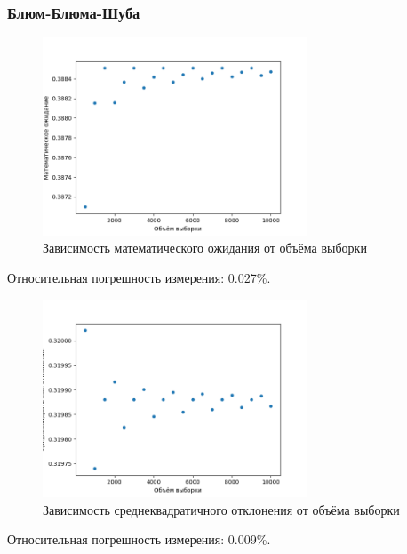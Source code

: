 \documentclass[bachelor, och, labwork]{SCWorks}
\begin{document}
\subsubsection{Блюм-Блюма-Шуба}
\begin{figure}[H]
  \centering
  \includegraphics[width=0.7\textwidth]{bbs_me.png}
  \caption{Зависимость математического ожидания от объёма выборки}
\end{figure}
Относительная погрешность измерения: 0.027\%.

\begin{figure}[H]
  \centering
  \includegraphics[width=0.7\textwidth]{bbs_st.png}
  \caption{Зависимость среднеквадратичного отклонения от объёма выборки}
\end{figure}
Относительная погрешность измерения: 0.009\%.
\end{document}
